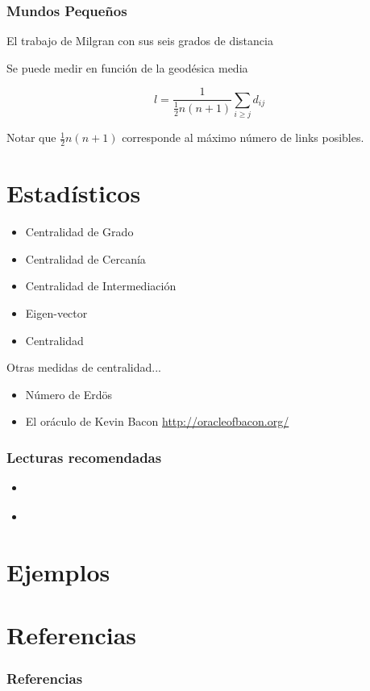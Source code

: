 \documentclass{beamer}
\begin{document}
\begin{frame}
\frametitle{Mundos Peque\~nos}

El trabajo de Milgran con sus seis grados de distancia

Se puede medir en funci\'on de la geod\'esica media

\begin{equation}
l = \frac{1}{\frac{1}{2}n(n+1)}\sum_{i\geq j}{d_{ij}}
\end{equation}

Notar que $\frac{1}{2}n(n+1)$ corresponde al m\'aximo n\'umero de links
posibles.
\end{frame}

\section{Estad\'isticos}

\begin{frame}
\begin{itemize}
\item Centralidad de Grado
\item Centralidad de Cercan\'ia
\item Centralidad de Intermediaci\'on
\item Eigen-vector
\item Centralidad
\end{itemize}

Otras medidas de centralidad...
\begin{itemize}
\item N\'umero de Erd{\"o}s \url{}
\item El or\'aculo de Kevin Bacon \url{http://oracleofbacon.org/}
\end{itemize}

\end{frame}

\begin{frame}
\frametitle{Lecturas recomendadas}

\begin{itemize}
\item \cite{newman2003structure}
\item 
\end{itemize}

\end{frame}

\section{Ejemplos}

\begin{frame}
\end{frame}

\section{Referencias}
\nocite{}
\begin{frame}
\frametitle{Referencias}


\end{frame}
\end{document}
